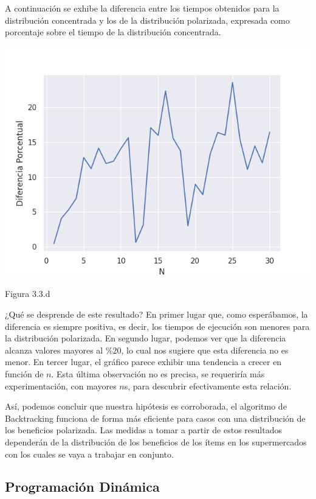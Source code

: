 \documentclass[a4paper]{article}
\begin{document}
A continuación se exhibe la diferencia entre los tiempos obtenidos para la distribución concentrada y los de la distribución polarizada, expresada como porcentaje sobre el tiempo de la distribución concentrada. 


\begin{center}
    \includegraphics[scale=0.8]{diferenciaPorcentual.png}
    
    
	\caption{Figura 3.3.d  }
  \end{center}

¿Qué se desprende de este resultado? En primer lugar que, como esperábamos, la diferencia es siempre positiva, es decir, los tiempos de ejecución son menores para la distribución polarizada. En segundo lugar, podemos ver que la diferencia alcanza valores mayores al 
$\%20$, lo cual nos sugiere que esta diferencia no es menor. En tercer lugar, el gráfico parece exhibir una tendencia a crecer en función de $n$. Esta última observación no es precisa, se requeriría más experimentación, con mayores $n$s, para descubrir efectivamente esta relación. 

Así, podemos concluir que nuestra hipótesis es corroborada, el algoritmo de Backtracking funciona de forma más eficiente para casos con una distribución de los beneficios polarizada. Las medidas a tomar a partir de estos resultados dependerán de la distribución de los beneficios de los ítems en los supermercados con los cuales se vaya a trabajar en conjunto. 


\subsection{Programación Dinámica}
\end{document}
